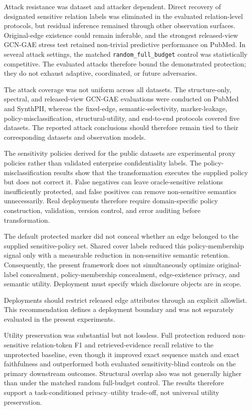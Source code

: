 \documentclass[preprint,12pt]{elsarticle}
\begin{document}
Attack resistance was dataset and attacker dependent. Direct recovery of designated sensitive relation labels was eliminated in the evaluated relation-level protocols, but residual inference remained through other observation surfaces. Original-edge existence could remain inferable, and the strongest released-view GCN-GAE stress test retained non-trivial predictive performance on PubMed. In several attack settings, the matched \nolinkurl{random_full_budget} control was statistically competitive. The evaluated attacks therefore bound the demonstrated protection; they do not exhaust adaptive, coordinated, or future adversaries.

The attack coverage was not uniform across all datasets. The structure-only, spectral, and released-view GCN-GAE evaluations were conducted on PubMed and SynthPII, whereas the fixed-edge, semantic-selectivity, marker-leakage, policy-misclassification, structural-utility, and end-to-end protocols covered five datasets. The reported attack conclusions should therefore remain tied to their corresponding datasets and observation models.

The sensitivity policies derived for the public datasets are experimental proxy policies rather than validated enterprise confidentiality labels. The policy-misclassification results show that the transformation executes the supplied policy but does not correct it. False negatives can leave oracle-sensitive relations insufficiently protected, and false positives can remove non-sensitive semantics unnecessarily. Real deployments therefore require domain-specific policy construction, validation, version control, and error auditing before transformation.

The default protected marker did not conceal whether an edge belonged to the supplied sensitive-policy set. Shared cover labels reduced this policy-membership signal only with a measurable reduction in non-sensitive semantic retention. Consequently, the present framework does not simultaneously optimize original-label concealment, policy-membership concealment, edge-existence privacy, and semantic utility. Deployment must specify which disclosure objects are in scope.

Deployments should restrict released edge attributes through an explicit allowlist. This recommendation defines a deployment boundary and was not separately evaluated in the present experiments.

Utility preservation was substantial but not lossless. Full protection reduced non-sensitive relation-token F1 and retrieved-evidence recall relative to the unprotected baseline, even though it improved exact sequence match and exact faithfulness and outperformed both evaluated sensitivity-blind controls on the primary downstream outcomes. Structural overlap also was not generally higher than under the matched random full-budget control. The results therefore support a task-conditioned privacy--utility trade-off, not universal utility preservation.
\end{document}

